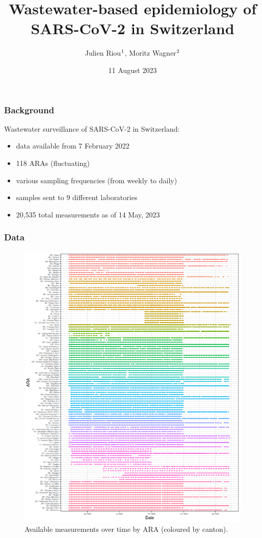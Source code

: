 \documentclass[10pt]{beamer}
\title{Wastewater-based epidemiology of SARS-CoV-2 in Switzerland}
\author{Julien Riou$\textsuperscript{1}$, Moritz Wagner$\textsuperscript{2}$}
\institute{$\textsuperscript{1}$UniBe, $\textsuperscript{2}$FOPH}
\date{ 11 August 2023 }
\begin{document}
	
	\frame{\titlepage}
	
	\begin{frame}
		\frametitle{Background}
		Wastewater surveillance of SARS-CoV-2 in Switzerland:
			\begin{itemize}
				\item data available from 7 February 2022
				\item \alert{118 ARAs} (fluctuating)
				\item various sampling frequencies (from weekly to daily)
				\item samples sent to \alert{9 different laboratories}
				\item 20,535 total measurements as of 14 May, 2023
			\end{itemize}
	\end{frame}
	
	
	\begin{frame}
		\frametitle{Data}
		\begin{figure}
			\includegraphics[width=.55\linewidth]{../reports/data_description_files/figure-html/fig1-1}
			\caption{Available measurements over time by ARA (coloured by canton).}
		\end{figure}
	\end{frame}
		
\end{document}
